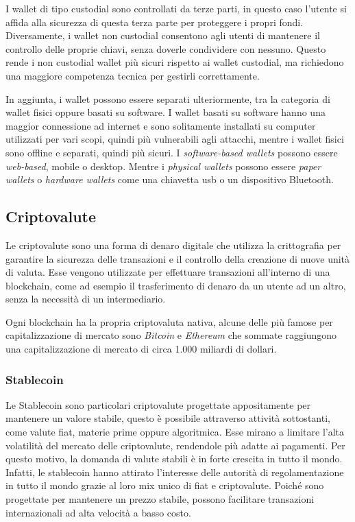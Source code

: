 I wallet di tipo custodial sono controllati da terze parti, in questo caso l'utente si affida alla sicurezza di questa terza parte per proteggere i propri fondi. Diversamente,  i wallet non custodial consentono agli utenti di mantenere il controllo delle proprie chiavi, senza doverle condividere con nessuno. Questo rende i non custodial wallet più sicuri rispetto ai wallet custodial, ma richiedono una maggiore competenza tecnica per gestirli correttamente.

In aggiunta, i wallet possono essere separati ulteriormente, tra la categoria di wallet fisici oppure basati su software.
I wallet basati su software hanno una maggior connessione ad internet e sono solitamente installati su computer utilizzati per vari scopi, quindi più vulnerabili agli attacchi, mentre i wallet fisici sono offline e separati, quindi più sicuri.
I \textit{software-based wallets} possono essere \textit{web-based}, mobile o desktop. Mentre i \textit{physical wallets} possono essere \textit{paper wallets} o \textit{hardware wallets} come una chiavetta usb o un dispositivo Bluetooth. \cite{custodial-wallet}

\subsection{Criptovalute}
\label{sec:criptovalute}

Le criptovalute sono una forma di denaro digitale che utilizza la crittografia per garantire la sicurezza delle transazioni e il controllo della creazione di nuove unità di valuta. 
Esse vengono utilizzate per effettuare transazioni all'interno di una blockchain, come ad esempio il trasferimento di denaro da un utente ad un altro, senza la necessità di un intermediario. \cite{binance-cryptocurrency}

Ogni blockchain ha la propria criptovaluta nativa, alcune delle più famose per capitalizzazione di mercato sono \textit{Bitcoin} e \textit{Ethereum} che sommate raggiungono una capitalizzazione di mercato di circa 1.000 miliardi di dollari. \cite{coinmarketcap}

\subsubsection{Stablecoin}
Le Stablecoin sono particolari criptovalute progettate appositamente per mantenere un valore stabile, questo è possibile attraverso attività sottostanti, come valute fiat, materie prime oppure algoritmica. Esse mirano a limitare l'alta volatilità del mercato delle criptovalute, rendendole più adatte ai pagamenti. Per questo motivo, la domanda di valute stabili è in forte crescita in tutto il mondo. \cite{swiss-stablecoin}
Infatti, le stablecoin hanno attirato l'interesse delle autorità di regolamentazione in tutto il mondo grazie al loro mix unico di fiat e criptovalute. Poiché sono progettate per mantenere un prezzo stabile, possono facilitare transazioni internazionali ad alta velocità a basso costo. \cite{binance-stablecoin}

\newpage





